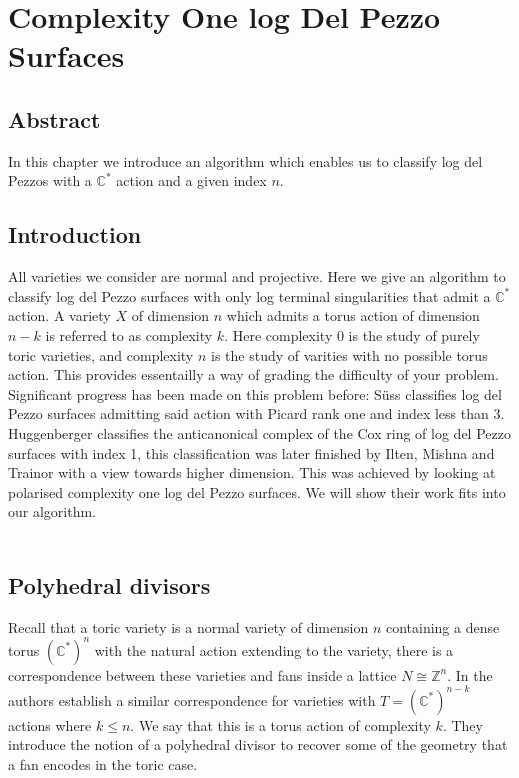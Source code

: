 \documentclass[12pt,a4paper]{book}      %
\theoremstyle{definition}
\newcommand{\C}[1]{(\mathbb{C}^*)^#1}
\newcommand{\mb}[1]{\mathbb{#1}}
\begin{document}
\chapter{Complexity One log Del Pezzo Surfaces}

\section{Abstract}

In this chapter we introduce an algorithm which enables us to classify log del Pezzos with a $\mb{C}^*$ action and a given index $n$.

\section{Introduction}

All varieties we consider are normal and projective. Here we give an algorithm to classify log del Pezzo surfaces  with only log terminal singularities that admit a $\mb{C}^*$ action. A variety $X$ of dimension $n$ which admits a torus action of dimension $n-k$ is referred to as complexity $k$. Here complexity 0 is the study of purely toric varieties, and complexity $n$ is the study of varities with no possible torus action. This provides essentailly a way of grading the difficulty of your problem. Significant progress has been made on this problem before: S\"{u}ss \cite{Suss} classifies log del Pezzo surfaces admitting said action with Picard rank one and index less than 3. Huggenberger \cite{Huggenberger} classifies the anticanonical complex of the Cox ring of log del Pezzo surfaces with index 1, this classification was later finished by Ilten, Mishna and Trainor \cite{IMT} with a view towards higher dimension. This was achieved by looking at polarised complexity one log del Pezzo surfaces. We will show their work fits into our algorithm. 
\\
\\
\section{Polyhedral divisors}
Recall that a toric variety is a  normal variety of dimension $n$ containing a dense torus $\C{n}$ with the natural action extending to the variety, there is a correspondence between these varieties and fans inside a lattice $N \cong \mathbb{Z}^n$.
In \cite{AltHau} the authors establish a similar correspondence for varieties with $T = \C{{ n-k}}$ actions where $k \leq n$. We say that this is a torus action of complexity $k$. They introduce the notion of a polyhedral divisor to recover some of the geometry that a fan encodes in the toric case. 
\end{document}

